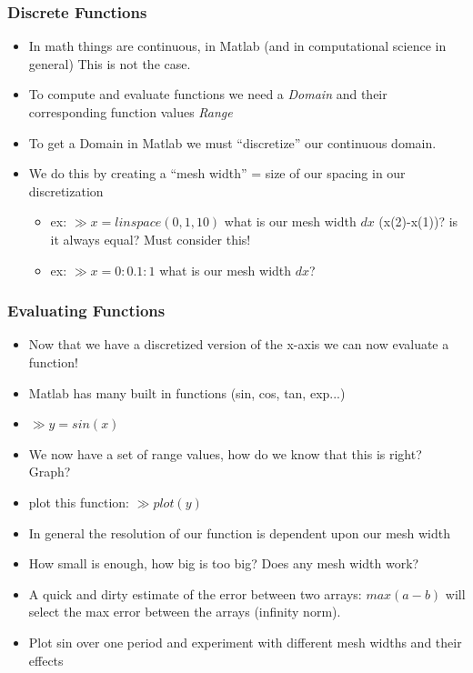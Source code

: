 \documentclass{beamer}
\newcommand{\I}{\textit}
\begin{document}
\begin{frame}
\frametitle{Discrete Functions} 
\begin{itemize}
\item In math things are continuous, in Matlab (and in computational science in general) This is not the case. 
\item To compute and evaluate functions we need a \I{Domain} and their corresponding function values \I{Range}
\item To get a Domain in Matlab we must ``discretize'' our continuous domain. 
\item We do this by creating a ``mesh width'' = size of our spacing in our discretization
\begin{itemize}
\item ex: $\gg x = linspace(0,1,10)$ what is our mesh width $dx$ (x(2)-x(1))? is it always equal? Must consider this!  
\item ex: $\gg x = 0:0.1:1$ what is our mesh width $dx$? 
\end{itemize}

\end{itemize}

\end{frame}


\begin{frame}
\frametitle{Evaluating Functions} 
\begin{itemize}
\item Now that we have a discretized version of the x-axis we can now evaluate a function! 
\item Matlab has many built in functions (sin, cos, tan, exp...)
\item $\gg y = sin(x) $ 
\item We now have a set of range values, how do we know that this is right? Graph? 
\item plot this function: $ \gg plot(y) $
\item In general the resolution of our function is dependent upon our mesh width
\item How small is enough, how big is too big? Does any mesh width work? 
\item A quick and dirty estimate of the error between two arrays: $max(a - b )$ will select the max error between the arrays (infinity norm). 
\item Plot sin over one period and experiment with different mesh widths and their effects
\end{itemize}

\end{frame}
\end{document}
